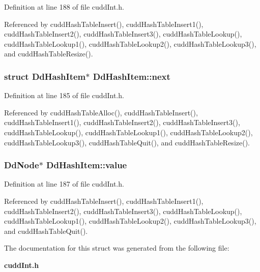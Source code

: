 Definition at line 188 of file cudd\-Int.h.

Referenced by cudd\-Hash\-Table\-Insert(), cudd\-Hash\-Table\-Insert1(), cudd\-Hash\-Table\-Insert2(), cudd\-Hash\-Table\-Insert3(), cudd\-Hash\-Table\-Lookup(), cudd\-Hash\-Table\-Lookup1(), cudd\-Hash\-Table\-Lookup2(), cudd\-Hash\-Table\-Lookup3(), and cudd\-Hash\-Table\-Resize().
\subsubsection{\setlength{\rightskip}{0pt plus 5cm}struct \bf{Dd\-Hash\-Item}$\ast$ \bf{Dd\-Hash\-Item::next}}\label{structDdHashItem_8552215a502b76f939920236cf86a20f}




Definition at line 185 of file cudd\-Int.h.

Referenced by cudd\-Hash\-Table\-Alloc(), cudd\-Hash\-Table\-Insert(), cudd\-Hash\-Table\-Insert1(), cudd\-Hash\-Table\-Insert2(), cudd\-Hash\-Table\-Insert3(), cudd\-Hash\-Table\-Lookup(), cudd\-Hash\-Table\-Lookup1(), cudd\-Hash\-Table\-Lookup2(), cudd\-Hash\-Table\-Lookup3(), cudd\-Hash\-Table\-Quit(), and cudd\-Hash\-Table\-Resize().
\subsubsection{\setlength{\rightskip}{0pt plus 5cm}\bf{Dd\-Node}$\ast$ \bf{Dd\-Hash\-Item::value}}\label{structDdHashItem_79c808ed42f415d140c3f1684ec8ae0e}




Definition at line 187 of file cudd\-Int.h.

Referenced by cudd\-Hash\-Table\-Insert(), cudd\-Hash\-Table\-Insert1(), cudd\-Hash\-Table\-Insert2(), cudd\-Hash\-Table\-Insert3(), cudd\-Hash\-Table\-Lookup(), cudd\-Hash\-Table\-Lookup1(), cudd\-Hash\-Table\-Lookup2(), cudd\-Hash\-Table\-Lookup3(), and cudd\-Hash\-Table\-Quit().

The documentation for this struct was generated from the following file:\begin{CompactItemize}
\item 
\bf{cudd\-Int.h}\end{CompactItemize}
